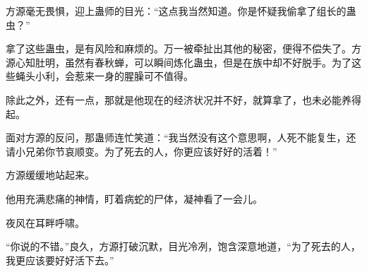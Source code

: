 \begin{this_body}
方源毫无畏惧，迎上蛊师的目光：“这点我当然知道。你是怀疑我偷拿了组长的蛊虫？”

拿了这些蛊虫，是有风险和麻烦的。万一被牵扯出其他的秘密，便得不偿失了。方源心知肚明，虽然有春秋蝉，可以瞬间炼化蛊虫，但是在族中却不好脱手。为了这些蝇头小利，会惹来一身的腥臊可不值得。

除此之外，还有一点，那就是他现在的经济状况并不好，就算拿了，也未必能养得起。

面对方源的反问，那蛊师连忙笑道：“我当然没有这个意思啊，人死不能复生，还请小兄弟你节哀顺变。为了死去的人，你更应该好好的活着！”

方源缓缓地站起来。

他用充满悲痛的神情，盯着病蛇的尸体，凝神看了一会儿。

夜风在耳畔呼啸。

“你说的不错。”良久，方源打破沉默，目光冷冽，饱含深意地道，“为了死去的人，我更应该要好好活下去。”

\end{this_body}

